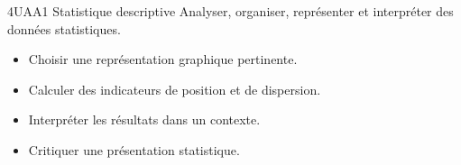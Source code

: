 \documentclass[11pt,a4paper]{article}
\begin{document}
\PageDeGardeUAA
{4UAA1}
{Statistique descriptive}
{Analyser, organiser, représenter et interpréter des données statistiques.}
{
\begin{itemize}
    \item Choisir une représentation graphique pertinente.
    \item Calculer des indicateurs de position et de dispersion.
    \item Interpréter les résultats dans un contexte.
    \item Critiquer une présentation statistique.
\end{itemize}
}

\clearpage











\end{document}
